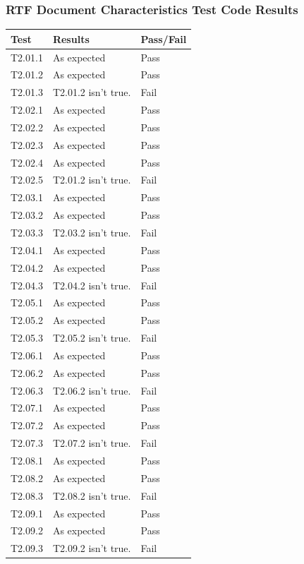\documentclass[]{article}
\begin{document}
\hypertarget{rtf-document-characteristics-test-code-results}{%
\subsubsection{RTF Document Characteristics Test Code
Results}\label{rtf-document-characteristics-test-code-results}}

\begin{table}[H]
\centering
\begin{tabular}{l|l|l}
\hline
Test & Results & Pass/Fail\\
\hline
T2.01.1 & As expected & Pass\\
\hline
T2.01.2 & As expected & Pass\\
\hline
T2.01.3 & T2.01.2 isn't true. & Fail\\
\hline
T2.02.1 & As expected & Pass\\
\hline
T2.02.2 & As expected & Pass\\
\hline
T2.02.3 & As expected & Pass\\
\hline
T2.02.4 & As expected & Pass\\
\hline
T2.02.5 & T2.01.2 isn't true. & Fail\\
\hline
T2.03.1 & As expected & Pass\\
\hline
T2.03.2 & As expected & Pass\\
\hline
T2.03.3 & T2.03.2 isn't true. & Fail\\
\hline
T2.04.1 & As expected & Pass\\
\hline
T2.04.2 & As expected & Pass\\
\hline
T2.04.3 & T2.04.2 isn't true. & Fail\\
\hline
T2.05.1 & As expected & Pass\\
\hline
T2.05.2 & As expected & Pass\\
\hline
T2.05.3 & T2.05.2 isn't true. & Fail\\
\hline
T2.06.1 & As expected & Pass\\
\hline
T2.06.2 & As expected & Pass\\
\hline
T2.06.3 & T2.06.2 isn't true. & Fail\\
\hline
T2.07.1 & As expected & Pass\\
\hline
T2.07.2 & As expected & Pass\\
\hline
T2.07.3 & T2.07.2 isn't true. & Fail\\
\hline
T2.08.1 & As expected & Pass\\
\hline
T2.08.2 & As expected & Pass\\
\hline
T2.08.3 & T2.08.2 isn't true. & Fail\\
\hline
T2.09.1 & As expected & Pass\\
\hline
T2.09.2 & As expected & Pass\\
\hline
T2.09.3 & T2.09.2 isn't true. & Fail\\
\hline
\end{tabular}
\end{table}
\end{document}
